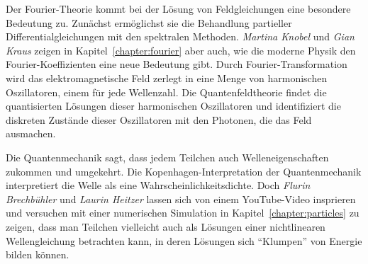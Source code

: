 %
%
Der Fourier-Theorie kommt bei der Lösung von Feldgleichungen eine
besondere Bedeutung zu.
%
Zunächst ermöglichst sie die Behandlung partieller Differentialgleichungen
mit den spektralen Methoden.
%
\emph{Martina Knobel}
%
%
und \emph{Gian Kraus}
%
%
zeigen in Kapitel~\ref{chapter:fourier} aber auch, wie die moderne
Physik den Fourier-Koeffizienten eine neue Bedeutung gibt.
Durch Fourier-Transformation wird das elektromagnetische Feld
zerlegt in eine Menge von harmonischen Oszillatoren, einem für jede
Wellenzahl.
%
%
Die Quantenfeldtheorie findet die quantisierten Lösungen dieser
%
harmonischen Oszillatoren und identifiziert die diskreten Zustände
dieser Oszillatoren mit den Photonen, die das Feld ausmachen.
%

%
%
Die Quantenmechanik sagt, dass jedem Teilchen auch Welleneigenschaften
%
zukommen und umgekehrt.
Die Kopenhagen-Interpretation der Quantenmechanik interpretiert die
Welle als eine Wahrscheinlichkeitsdichte.
Doch
\emph{Flurin Brechbühler}
%
%
und
\emph{Laurin Heitzer}
%
lassen sich von einem YouTube-Video insprieren und versuchen mit einer
numerischen Simulation in Kapitel~\ref{chapter:particles} zu zeigen,
dass man Teilchen vielleicht auch
als Lösungen einer nichtlinearen Wellengleichung betrachten kann,
in deren Lösungen sich ``Klumpen'' von Energie bilden können.
